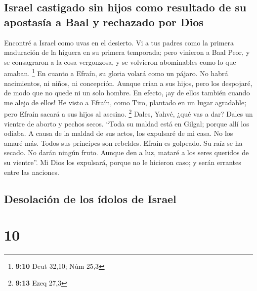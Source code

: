 \hypertarget{israel-castigado-sin-hijos-como-resultado-de-su-apostasuxeda-a-baal-y-rechazado-por-dios}{%
\subsection{Israel castigado sin hijos como resultado de su apostasía a
Baal y rechazado por
Dios}\label{israel-castigado-sin-hijos-como-resultado-de-su-apostasuxeda-a-baal-y-rechazado-por-dios}}

 Encontré a Israel como uvas en el desierto. Vi a tus
padres como la primera maduración de la higuera en su primera temporada;
pero vinieron a Baal Peor, y se consagraron a la cosa vergonzosa, y se
volvieron abominables como lo que amaban. \footnote{\textbf{9:10} Deut
  32,10; Núm 25,3}  En cuanto a Efraín, su gloria volará
como un pájaro. No habrá nacimientos, ni niños, ni concepción.
 Aunque crian a sus hijos, pero los despojaré, de modo
que no quede ni un solo hombre. En efecto, ¡ay de ellos también cuando
me alejo de ellos!  He visto a Efraín, como Tiro,
plantado en un lugar agradable; pero Efraín sacará a sus hijos al
asesino. \footnote{\textbf{9:13} Ezeq 27,3}  Dales,
Yahvé, ¿qué vas a dar? Dales un vientre de aborto y pechos secos.
 ``Toda su maldad está en Gilgal; porque allí los odiaba.
A causa de la maldad de sus actos, los expulsaré de mi casa. No los
amaré más. Todos sus príncipes son rebeldes.  Efraín es
golpeado. Su raíz se ha secado. No darán ningún fruto. Aunque den a luz,
mataré a los seres queridos de su vientre''.  Mi Dios los
expulsará, porque no le hicieron caso; y serán errantes entre las
naciones.

\hypertarget{desolaciuxf3n-de-los-uxeddolos-de-israel}{%
\subsection{Desolación de los ídolos de
Israel}\label{desolaciuxf3n-de-los-uxeddolos-de-israel}}

\hypertarget{section-9}{%
\section{10}\label{section-9}}

